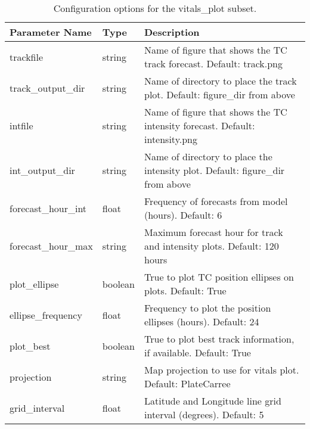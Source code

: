 \documentclass[psfig,12pt]{article}
\begin{document}
\begin{table}[H]  
\caption{Configuration options for the vitals\_plot subset.}
\begin{center}
\begin{tabular}{|p{1.60in}|p{0.5in}|p{4.15in}|}
\hline
Parameter Name & Type & Description \\ \hline \hline
trackfile & string & Name of figure that shows the TC track forecast.  Default:  track.png \\ \hline
track\_output\_dir & string & Name of directory to place the track plot.  Default: figure\_dir from above \\ \hline
intfile & string & Name of figure that shows the TC intensity forecast.  Default:  intensity.png \\ \hline
int\_output\_dir & string & Name of directory to place the intensity plot.  Default: figure\_dir from above \\ \hline
forecast\_hour\_int & float & Frequency of forecasts from model (hours).  Default: 6 \\ \hline
forecast\_hour\_max & string & Maximum forecast hour for track and intensity plots.  
Default:  120 hours \\ \hline
plot\_ellipse & boolean & True to plot TC position ellipses on plots.  Default:  True \\ \hline
ellipse\_frequency & float & Frequency to plot the position ellipses (hours).  Default: 24 \\ \hline
plot\_best & boolean & True to plot best track information, if available.  Default:  True \\ \hline
projection & string & Map projection to use for vitals plot.  Default:  PlateCarree \\ \hline
grid\_interval & float & Latitude and Longitude line grid interval (degrees).  Default:  5 \\ \hline
\end{tabular}
\end{center}
\end{table}
\end{document}
